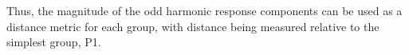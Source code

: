 \documentclass[9pt,twocolumn,twoside,lineno]{pnas-new}
\begin{document}
Thus, the magnitude of the odd harmonic response components can be used as a distance metric for each group, with distance being measured relative to the simplest group, P1. 









\end{document}
